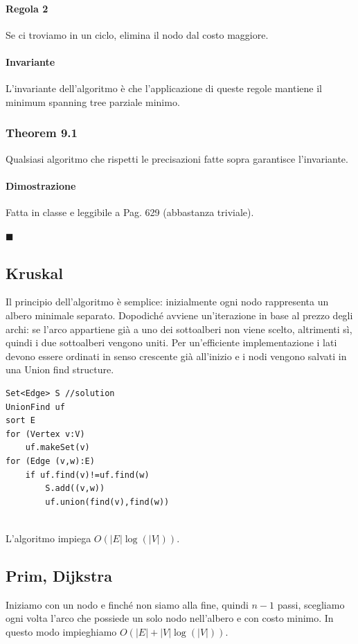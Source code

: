 \documentclass[a4paper]{book}
\newenvironment{mytheorem}[1]{\subsubsection*{Theorem #1}}{\begin{flushright}$\blacksquare$\end{flushright}}
\newcommand{\lstIndent}{4}
\begin{document}
\paragraph*{Regola 2} Se ci troviamo in un ciclo, elimina il nodo dal costo maggiore.
\paragraph*{Invariante} L'invariante dell'algoritmo è che l'applicazione di queste regole mantiene il minimum spanning tree parziale minimo. 
\begin{mytheorem}{9.1}
Qualsiasi algoritmo che rispetti le precisazioni fatte sopra garantisce l'invariante.
\paragraph*{Dimostrazione} Fatta in classe e leggibile a Pag. 629 (abbastanza triviale).
\end{mytheorem}
\subsection{Kruskal}
Il principio dell'algoritmo è semplice: inizialmente ogni nodo rappresenta un albero minimale separato. Dopodiché avviene un'iterazione in base al prezzo degli archi: se l'arco appartiene già a uno dei sottoalberi non viene scelto, altrimenti sì, quindi i due sottoalberi vengono uniti. Per un'efficiente implementazione i lati devono essere ordinati in senso crescente già all'inizio e i nodi vengono salvati in una Union find structure. 
\begin{lstlisting}[tabsize=\lstIndent]
Set<Edge> S //solution
UnionFind uf
sort E
for (Vertex v:V)
	uf.makeSet(v)
for (Edge (v,w):E)
	if uf.find(v)!=uf.find(w)
		S.add((v,w))
		uf.union(find(v),find(w))
	
\end{lstlisting}
L'algoritmo impiega $O(|E|\log (|V|))$.
\subsection{Prim, Dijkstra}
Iniziamo con un nodo e finché non siamo alla fine, quindi $n-1$ passi, scegliamo ogni volta l'arco che possiede un solo nodo nell'albero e con costo minimo. In questo modo impieghiamo $O(|E|+|V|\log (|V|))$.
\end{document}
